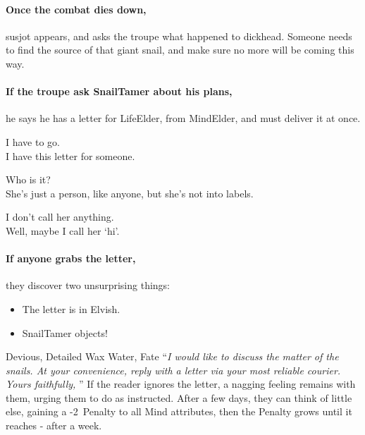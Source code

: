 \paragraph{Once the combat dies down,}
\gls{susjot} appears, and asks the troupe what happened to \gls{dickhead}.
Someone needs to find the source of that giant snail, and make sure no more will be coming this way.

\paragraph{If the troupe ask \gls{SnailTamer} about his plans,}
he says he has a letter for \gls{LifeElder}, from \gls{MindElder}, and must deliver it at once.

\begin{speechtext}
  I have to go. \\
  I have this letter for someone.

  Who is it? \\
  She's just a person, like anyone, but she's not into labels.

  I don't call her anything. \\
  Well, maybe I call her `hi'.
\end{speechtext}

\paragraph{If anyone grabs the letter,}
they discover two unsurprising things:

\begin{itemize}
  \item
  The letter is in Elvish.
  \item
  \Gls{SnailTamer} objects!
\end{itemize}

  {Devious, Detailed}%
  {Wax}%
  {Water, Fate}%
  {}%
  {``\textit{I would like to discuss the matter of the snails.
  At your convenience, reply with a letter via your most reliable courier.  Yours faithfully, }''}%
  {If the reader ignores the letter, a nagging feeling remains with them, urging them to do as instructed.
  After a few days, they can think of little else, gaining a -2~Penalty to all Mind \glspl{attribute}, then the Penalty grows until it  reaches - after a week.}%

\showTalisman

